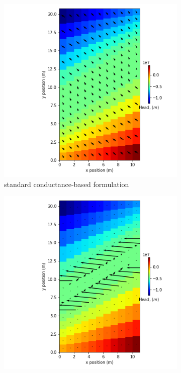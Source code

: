 \documentclass{article}
\begin{document}
\begin{figure}[H]
\centering
\begin{subfigure}{0.4\textwidth}
	\includegraphics[width=\textwidth]{../figures/disu-d-cf-vs-s-head.png}
	\caption{standard conductance-based formulation}
	\label{fig:disu-s-cc-cf-head}
\end{subfigure}
\hfill
\begin{subfigure}{0.4\textwidth}
	\includegraphics[width=\textwidth]{../figures/disu-d-cf-vs-x-head.png}

\end{subfigure}
\end{figure}
\end{document}
